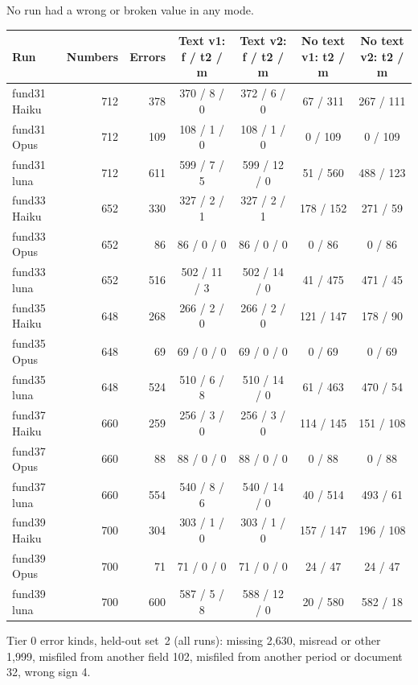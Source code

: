  No run had a wrong or broken value in any mode.
\begin{center}
\begin{tabular}{lrrcccc}
\toprule
Run & Numbers & Errors & Text v1: f / t2 / m & Text v2: f / t2 / m & No text v1: t2 / m & No text v2: t2 / m \\
\midrule
fund31 Haiku & 712 & 378 & 370 / 8 / 0 & 372 / 6 / 0 & 67 / 311 & 267 / 111 \\
fund31 Opus & 712 & 109 & 108 / 1 / 0 & 108 / 1 / 0 & 0 / 109 & 0 / 109 \\
fund31 luna & 712 & 611 & 599 / 7 / 5 & 599 / 12 / 0 & 51 / 560 & 488 / 123 \\
fund33 Haiku & 652 & 330 & 327 / 2 / 1 & 327 / 2 / 1 & 178 / 152 & 271 / 59 \\
fund33 Opus & 652 & 86 & 86 / 0 / 0 & 86 / 0 / 0 & 0 / 86 & 0 / 86 \\
fund33 luna & 652 & 516 & 502 / 11 / 3 & 502 / 14 / 0 & 41 / 475 & 471 / 45 \\
fund35 Haiku & 648 & 268 & 266 / 2 / 0 & 266 / 2 / 0 & 121 / 147 & 178 / 90 \\
fund35 Opus & 648 & 69 & 69 / 0 / 0 & 69 / 0 / 0 & 0 / 69 & 0 / 69 \\
fund35 luna & 648 & 524 & 510 / 6 / 8 & 510 / 14 / 0 & 61 / 463 & 470 / 54 \\
fund37 Haiku & 660 & 259 & 256 / 3 / 0 & 256 / 3 / 0 & 114 / 145 & 151 / 108 \\
fund37 Opus & 660 & 88 & 88 / 0 / 0 & 88 / 0 / 0 & 0 / 88 & 0 / 88 \\
fund37 luna & 660 & 554 & 540 / 8 / 6 & 540 / 14 / 0 & 40 / 514 & 493 / 61 \\
fund39 Haiku & 700 & 304 & 303 / 1 / 0 & 303 / 1 / 0 & 157 / 147 & 196 / 108 \\
fund39 Opus & 700 & 71 & 71 / 0 / 0 & 71 / 0 / 0 & 24 / 47 & 24 / 47 \\
fund39 luna & 700 & 600 & 587 / 5 / 8 & 588 / 12 / 0 & 20 / 580 & 582 / 18 \\
\bottomrule
\end{tabular}
\end{center}

Tier 0 error kinds, held-out set~2 (all runs): missing 2,630, misread or other 1,999, misfiled from another field 102, misfiled from another period or document 32, wrong sign 4.


